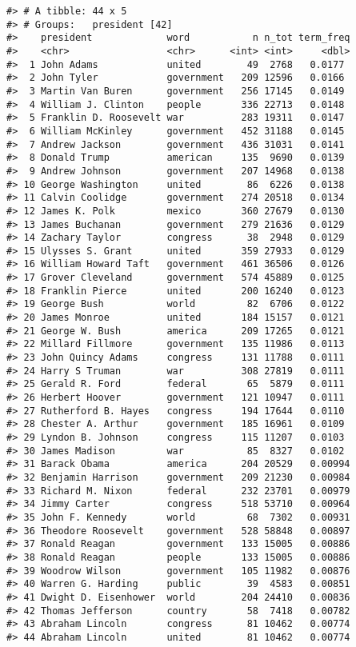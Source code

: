 \documentclass[
]{book}
\begin{document}
\begin{verbatim}
#> # A tibble: 44 x 5
#> # Groups:   president [42]
#>    president             word           n n_tot term_freq
#>    <chr>                 <chr>      <int> <int>     <dbl>
#>  1 John Adams            united        49  2768   0.0177 
#>  2 John Tyler            government   209 12596   0.0166 
#>  3 Martin Van Buren      government   256 17145   0.0149 
#>  4 William J. Clinton    people       336 22713   0.0148 
#>  5 Franklin D. Roosevelt war          283 19311   0.0147 
#>  6 William McKinley      government   452 31188   0.0145 
#>  7 Andrew Jackson        government   436 31031   0.0141 
#>  8 Donald Trump          american     135  9690   0.0139 
#>  9 Andrew Johnson        government   207 14968   0.0138 
#> 10 George Washington     united        86  6226   0.0138 
#> 11 Calvin Coolidge       government   274 20518   0.0134 
#> 12 James K. Polk         mexico       360 27679   0.0130 
#> 13 James Buchanan        government   279 21636   0.0129 
#> 14 Zachary Taylor        congress      38  2948   0.0129 
#> 15 Ulysses S. Grant      united       359 27933   0.0129 
#> 16 William Howard Taft   government   461 36506   0.0126 
#> 17 Grover Cleveland      government   574 45889   0.0125 
#> 18 Franklin Pierce       united       200 16240   0.0123 
#> 19 George Bush           world         82  6706   0.0122 
#> 20 James Monroe          united       184 15157   0.0121 
#> 21 George W. Bush        america      209 17265   0.0121 
#> 22 Millard Fillmore      government   135 11986   0.0113 
#> 23 John Quincy Adams     congress     131 11788   0.0111 
#> 24 Harry S Truman        war          308 27819   0.0111 
#> 25 Gerald R. Ford        federal       65  5879   0.0111 
#> 26 Herbert Hoover        government   121 10947   0.0111 
#> 27 Rutherford B. Hayes   congress     194 17644   0.0110 
#> 28 Chester A. Arthur     government   185 16961   0.0109 
#> 29 Lyndon B. Johnson     congress     115 11207   0.0103 
#> 30 James Madison         war           85  8327   0.0102 
#> 31 Barack Obama          america      204 20529   0.00994
#> 32 Benjamin Harrison     government   209 21230   0.00984
#> 33 Richard M. Nixon      federal      232 23701   0.00979
#> 34 Jimmy Carter          congress     518 53710   0.00964
#> 35 John F. Kennedy       world         68  7302   0.00931
#> 36 Theodore Roosevelt    government   528 58848   0.00897
#> 37 Ronald Reagan         government   133 15005   0.00886
#> 38 Ronald Reagan         people       133 15005   0.00886
#> 39 Woodrow Wilson        government   105 11982   0.00876
#> 40 Warren G. Harding     public        39  4583   0.00851
#> 41 Dwight D. Eisenhower  world        204 24410   0.00836
#> 42 Thomas Jefferson      country       58  7418   0.00782
#> 43 Abraham Lincoln       congress      81 10462   0.00774
#> 44 Abraham Lincoln       united        81 10462   0.00774
\end{verbatim}
\end{document}
